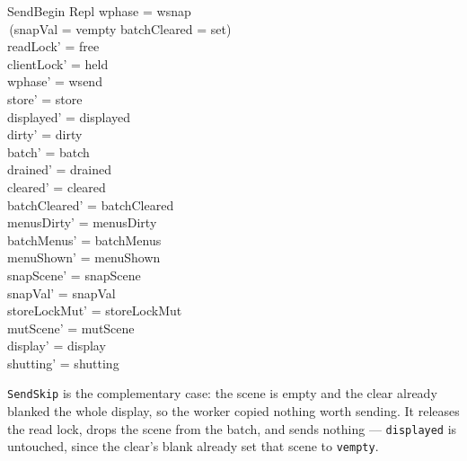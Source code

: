 \documentclass[a4paper,10pt,fleqn]{article}
\begin{document}
\begin{schema}{SendBegin}
  \Delta Repl
\where
  wphase = wsnap \\
  \lnot\,(snapVal = vempty \land batchCleared = set) \\
  readLock' = free \\
  clientLock' = held \\
  wphase' = wsend \\
  store' = store \\
  displayed' = displayed \\
  dirty' = dirty \\
  batch' = batch \\
  drained' = drained \\
  cleared' = cleared \\
  batchCleared' = batchCleared \\
  menusDirty' = menusDirty \\
  batchMenus' = batchMenus \\
  menuShown' = menuShown \\
  snapScene' = snapScene \\
  snapVal' = snapVal \\
  storeLockMut' = storeLockMut \\
  mutScene' = mutScene \\
  display' = display \\
  shutting' = shutting
\end{schema}

\texttt{SendSkip} is the complementary case: the scene is empty and the
clear already blanked the whole display, so the worker copied nothing worth
sending.  It releases the read lock, drops the scene from the batch, and
sends nothing --- \texttt{displayed} is untouched, since the clear's blank
already set that scene to \texttt{vempty}.
\end{document}
